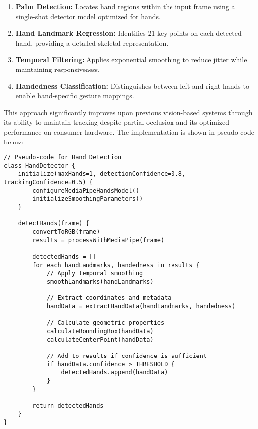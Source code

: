 \documentclass[arxiv,usenatbib]{iupartex}
\begin{document}
\begin{enumerate}
  \item \textbf{Palm Detection:} Locates hand regions within the input frame using a single-shot detector model optimized for hands.
  
  \item \textbf{Hand Landmark Regression:} Identifies 21 key points on each detected hand, providing a detailed skeletal representation.
  
  \item \textbf{Temporal Filtering:} Applies exponential smoothing to reduce jitter while maintaining responsiveness.
  
  \item \textbf{Handedness Classification:} Distinguishes between left and right hands to enable hand-specific gesture mappings.
\end{enumerate}

This approach significantly improves upon previous vision-based systems through its ability to maintain tracking despite partial occlusion and its optimized performance on consumer hardware. The implementation is shown in pseudo-code below:

\begin{lstlisting}[style=codestyle]
// Pseudo-code for Hand Detection
class HandDetector {
    initialize(maxHands=1, detectionConfidence=0.8, trackingConfidence=0.5) {
        configureMediaPipeHandsModel()
        initializeSmoothingParameters()
    }
    
    detectHands(frame) {
        convertToRGB(frame)
        results = processWithMediaPipe(frame)
        
        detectedHands = []
        for each handLandmarks, handedness in results {
            // Apply temporal smoothing
            smoothLandmarks(handLandmarks)
            
            // Extract coordinates and metadata
            handData = extractHandData(handLandmarks, handedness)
            
            // Calculate geometric properties
            calculateBoundingBox(handData)
            calculateCenterPoint(handData)
            
            // Add to results if confidence is sufficient
            if handData.confidence > THRESHOLD {
                detectedHands.append(handData)
            }
        }
        
        return detectedHands
    }
}
\end{lstlisting}
\end{document}
